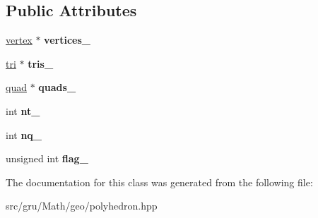 \subsection*{\-Public \-Attributes}
\begin{DoxyCompactItemize}
\item 
\hypertarget{classmath_1_1geo_1_1polyhedron_a95b429bd2b0b049560fc008563663b17}{\hyperlink{classmath_1_1geo_1_1vertex}{vertex} $\ast$ {\bfseries vertices\-\_\-}}\label{classmath_1_1geo_1_1polyhedron_a95b429bd2b0b049560fc008563663b17}

\item 
\hypertarget{classmath_1_1geo_1_1polyhedron_a1f3a59fa6add8c59eea9deea460c3c96}{\hyperlink{classmath_1_1geo_1_1tri}{tri} $\ast$ {\bfseries tris\-\_\-}}\label{classmath_1_1geo_1_1polyhedron_a1f3a59fa6add8c59eea9deea460c3c96}

\item 
\hypertarget{classmath_1_1geo_1_1polyhedron_aece41abb7f5005d9ff6de2016aae790c}{\hyperlink{classmath_1_1geo_1_1quad}{quad} $\ast$ {\bfseries quads\-\_\-}}\label{classmath_1_1geo_1_1polyhedron_aece41abb7f5005d9ff6de2016aae790c}

\item 
\hypertarget{classmath_1_1geo_1_1polyhedron_ab8bbfdd91290c53d8f8e0c55c3f11fdd}{int {\bfseries nt\-\_\-}}\label{classmath_1_1geo_1_1polyhedron_ab8bbfdd91290c53d8f8e0c55c3f11fdd}

\item 
\hypertarget{classmath_1_1geo_1_1polyhedron_ac5bbb1b818226c30b4f8ea39006efa57}{int {\bfseries nq\-\_\-}}\label{classmath_1_1geo_1_1polyhedron_ac5bbb1b818226c30b4f8ea39006efa57}

\item 
\hypertarget{classmath_1_1geo_1_1polyhedron_a962cdc8309c56bd40a34c3af223d6fd3}{unsigned int {\bfseries flag\-\_\-}}\label{classmath_1_1geo_1_1polyhedron_a962cdc8309c56bd40a34c3af223d6fd3}

\end{DoxyCompactItemize}


\-The documentation for this class was generated from the following file\-:\begin{DoxyCompactItemize}
\item 
src/gru/\-Math/geo/polyhedron.\-hpp\end{DoxyCompactItemize}
